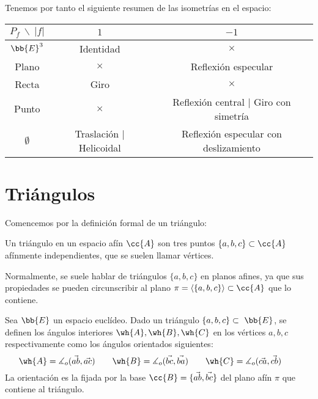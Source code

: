 Tenemos por tanto el siguiente resumen de las isometrías en el espacio:
\begin{table}[H]
    \centering
    \begin{tabular}{c||c|c}
        $P_f~ \backslash~|f|$ & $1$ & $-1$  \\ \hline \hline
        $\bb{E}^3$ & Identidad & $\times$ \\
        Plano & $\times$ & Reflexión especular \\
        Recta & Giro & $\times$ \\
        Punto & $\times$ & Reflexión central $\mid$ Giro con simetría \\
        $\emptyset$ & Traslación $\mid$ Helicoidal & Reflexión especular con deslizamiento
    \end{tabular}
\end{table}


\section{Triángulos}

Comencemos por la definición formal de un triángulo:
\begin{definicion}[Triángulo]
    Un triángulo en un espacio afín $\cc{A}$ son tres puntos $\{a,b,c\}\subset \cc{A}$ afínmente independientes, que se suelen llamar vértices.
\end{definicion}
Normalmente, se suele hablar de triángulos $\{a, b, c\}$ en planos afines, ya que sus propiedades se pueden circunscribir al plano $\pi = \langle\{a, b, c\}\rangle\subset \cc{A}$ que lo contiene.

\begin{definicion}
    Sea $\bb{E}$ un espacio euclídeo. Dado un triángulo $\{a,b,c\}\subset~\bb{E}$, se definen los ángulos interiores $\wh{A}, \wh{B}, \wh{C}$ en los vértices $a,b,c$ respectivamente como los ángulos orientados siguientes:
    \begin{equation*}
        \wh{A} = \measuredangle_o (\vec{ab}, \vec{ac}) \qquad
        \wh{B} = \measuredangle_o (\vec{bc}, \vec{ba}) \qquad
        \wh{C} = \measuredangle_o (\vec{ca}, \vec{cb}) \qquad
    \end{equation*}
    La orientación es la fijada por la base $\cc{B}=\{\vec{ab}, \vec{bc}\}$ del plano afín $\pi$ que contiene al triángulo.
\end{definicion}

